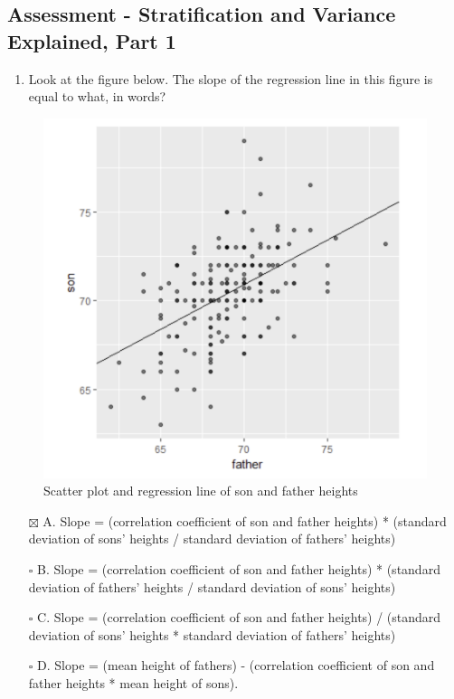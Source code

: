 \documentclass[
]{article}
\providecommand{\tightlist}{%
  \setlength{\itemsep}{0pt}\setlength{\parskip}{0pt}}
\begin{document}
\hypertarget{assessment---stratification-and-variance-explained-part-1}{%
\subsection{Assessment - Stratification and Variance Explained, Part
1}\label{assessment---stratification-and-variance-explained-part-1}}

\begin{enumerate}
\def\labelenumi{\arabic{enumi}.}
\tightlist
\item
  Look at the figure below. The slope of the regression line in this
  figure is equal to what, in words?
\end{enumerate}

\begin{figure}
\centering
\includegraphics{images/regression_line_father_son.png}
\caption{Scatter plot and regression line of son and father heights}
\end{figure}

\begin{itemize}
\tightlist
\item[$\boxtimes$]
  A. Slope = (correlation coefficient of son and father heights) *
  (standard deviation of sons' heights / standard deviation of fathers'
  heights)
\item[$\square$]
  B. Slope = (correlation coefficient of son and father heights) *
  (standard deviation of fathers' heights / standard deviation of sons'
  heights)
\item[$\square$]
  C. Slope = (correlation coefficient of son and father heights) /
  (standard deviation of sons' heights * standard deviation of fathers'
  heights)
\item[$\square$]
  D. Slope = (mean height of fathers) - (correlation coefficient of son
  and father heights * mean height of sons).
\end{itemize}
\end{document}
